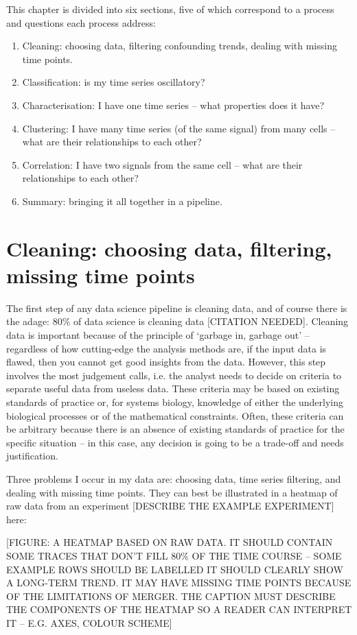 This chapter is divided into six sections, five of which correspond to a process and questions each process address:
\begin{enumerate}
  \item Cleaning: choosing data, filtering confounding trends, dealing with missing time points.
  \item Classification: is my time series oscillatory?
  \item Characterisation: I have one time series -- what properties does it have?
  \item Clustering: I have many time series (of the same signal) from many cells -- what are their relationships to each other?
  \item Correlation: I have two signals from the same cell -- what are their relationships to each other?
  \item Summary: bringing it all together in a pipeline.
\end{enumerate}

\section{Cleaning: choosing data, filtering, missing time points}
\label{sec:analysis-cleaning}

The first step of any data science pipeline is cleaning data, and of course there is the adage: 80\% of data science is cleaning data [CITATION NEEDED].
Cleaning data is important because of the principle of `garbage in, garbage out' -- regardless of how cutting-edge the analysis methods are, if the input data is flawed, then you cannot get good insights from the data.
However, this step involves the most judgement calls, i.e. the analyst needs to decide on criteria to separate useful data from useless data.
These criteria may be based on existing standards of practice or, for systems biology, knowledge of either the underlying biological processes or of the mathematical constraints.
Often, these criteria can be arbitrary because there is an absence of existing standards of practice for the specific situation -- in this case, any decision is going to be a trade-off and needs justification.

Three problems I occur in my data are: choosing data, time series filtering, and dealing with missing time points.
They can best be illustrated in a heatmap of raw data from an experiment [DESCRIBE THE EXAMPLE EXPERIMENT] here:

[FIGURE: A HEATMAP BASED ON RAW DATA.  IT SHOULD CONTAIN SOME TRACES THAT DON'T FILL 80\% OF THE TIME COURSE -- SOME EXAMPLE ROWS SHOULD BE LABELLED  IT SHOULD CLEARLY SHOW A LONG-TERM TREND.  IT MAY HAVE MISSING TIME POINTS BECAUSE OF THE LIMITATIONS OF MERGER.  THE CAPTION MUST DESCRIBE THE COMPONENTS OF THE HEATMAP SO A READER CAN INTERPRET IT -- E.G. AXES, COLOUR SCHEME]


